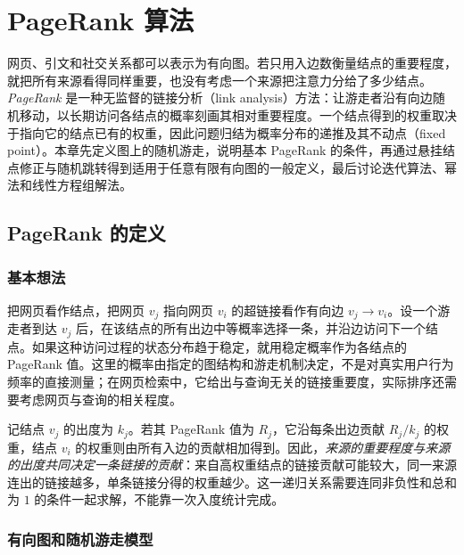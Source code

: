 \setcounter{chapter}{21} %
\chapter{PageRank 算法}
\label{chap:lihang-pagerank}


网页、引文和社交关系都可以表示为有向图。若只用入边数衡量结点的重要程度，就把所有来源看得同样重要，也没有考虑一个来源把注意力分给了多少结点。\emph{PageRank} 是一种无监督的链接分析（link analysis）方法：让游走者沿有向边随机移动，以长期访问各结点的概率刻画其相对重要程度。一个结点得到的权重取决于指向它的结点已有的权重，因此问题归结为概率分布的递推及其不动点（fixed point）。本章先定义图上的随机游走，说明基本 PageRank 的条件，再通过悬挂结点修正与随机跳转得到适用于任意有限有向图的一般定义，最后讨论迭代算法、幂法和线性方程组解法。

\section{PageRank 的定义}
\label{sec:lihang-pr-definition}

\subsection{基本想法}
\label{subsec:lihang-pr-idea}

把网页看作结点，把网页 $v_j$ 指向网页 $v_i$ 的超链接看作有向边 $v_j\to v_i$。设一个游走者到达 $v_j$ 后，在该结点的所有出边中等概率选择一条，并沿边访问下一个结点。如果这种访问过程的状态分布趋于稳定，就用稳定概率作为各结点的 PageRank 值。这里的概率由指定的图结构和游走机制决定，不是对真实用户行为频率的直接测量；在网页检索中，它给出与查询无关的链接重要度，实际排序还需要考虑网页与查询的相关程度。

记结点 $v_j$ 的出度为 $k_j$。若其 PageRank 值为 $R_j$，它沿每条出边贡献 $R_j/k_j$ 的权重，结点 $v_i$ 的权重则由所有入边的贡献相加得到。因此，\emph{来源的重要程度与来源的出度共同决定一条链接的贡献}：来自高权重结点的链接贡献可能较大，同一来源连出的链接越多，单条链接分得的权重越少。这一递归关系需要连同非负性和总和为 $1$ 的条件一起求解，不能靠一次入度统计完成。

\subsection{有向图和随机游走模型}
\label{subsec:lihang-pr-graph-walk}

